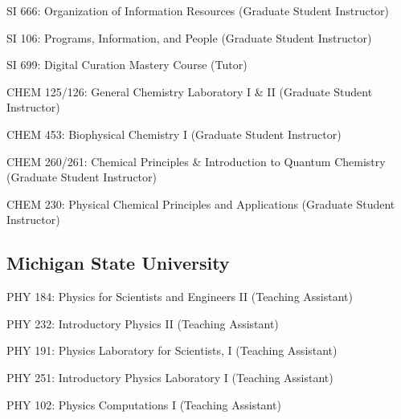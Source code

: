 \documentclass[12pt,letterpaper]{report}
\newcommand{\listitemspace}{0.15em}
\renewenvironment{itemize}
{\begin{list}{}{\setlength{\leftmargin}{0em}
            \setlength{\parskip}{0em}
            \setlength{\itemsep}{\listitemspace}
            \setlength{\parsep}{\listitemspace}}}
    {\end{list}}
\begin{document}
    \begin{itemize}
    	
    	  \item SI 666: Organization of Information Resources (Graduate Student Instructor)
        
    	  \item SI 106: Programs, Information, and People (Graduate Student Instructor)
        
        \item SI 699: Digital Curation Mastery Course (Tutor)
        
        \item CHEM 125/126: General Chemistry Laboratory I & II (Graduate Student Instructor)
        
        \item CHEM 453: Biophysical Chemistry I (Graduate Student Instructor)
        
        \item CHEM 260/261: Chemical Principles & Introduction to Quantum Chemistry (Graduate Student Instructor)
        
        \item CHEM 230: Physical Chemical Principles and Applications (Graduate Student Instructor)
    
	  \end{itemize}
    	
    \subsection*{Michigan State University}

    \begin{itemize}

        \item PHY 184: Physics for Scientists and Engineers II (Teaching Assistant)
        
        \item PHY 232: Introductory Physics II (Teaching Assistant)
        
        \item PHY 191: Physics Laboratory for Scientists, I (Teaching Assistant)
        
        \item PHY 251: Introductory Physics Laboratory I (Teaching Assistant)
        
        \item PHY 102: Physics Computations I (Teaching Assistant)

    \end{itemize}
\end{document}
